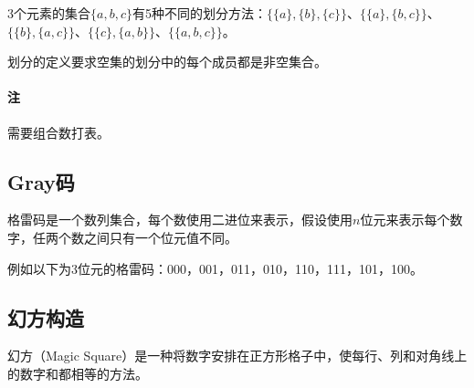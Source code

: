 3个元素的集合$\{a,b,c\}$有5种不同的划分方法：$\{\{a\},\{b\},\{c\}\}$、$\{\{a\},\{b,c\}\}$、$\{\{b\},\{a,c\}\}$、$\{\{c\},\{a,b\}\}$、$\{\{a,b,c\}\}$。

划分的定义要求空集的划分中的每个成员都是非空集合。

\paragraph{注} 需要组合数打表。



\subsection{Gray码}

格雷码是一个数列集合，每个数使用二进位来表示，假设使用$n$位元来表示每个数字，任两个数之间只有一个位元值不同。

例如以下为3位元的格雷码：000，001，011，010，110，111，101，100。



\subsection{幻方构造}

幻方（Magic Square）是一种将数字安排在正方形格子中，使每行、列和对角线上的数字和都相等的方法。


